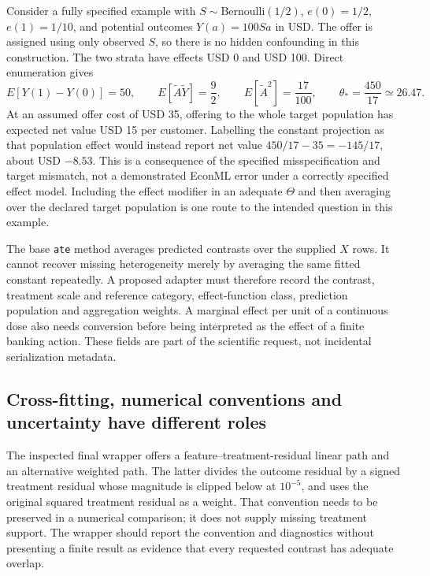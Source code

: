Consider a fully specified example with $S\sim\mathrm{Bernoulli}(1/2)$,
$e(0)=1/2$, $e(1)=1/10$, and potential outcomes $Y(a)=100Sa$ in USD.
The offer is assigned using only observed $S$, so there is no hidden
confounding in this construction. The two strata have effects USD 0 and
USD 100. Direct enumeration gives
\begin{equation}
 E[Y(1)-Y(0)]=50,\qquad
 E[\widetilde A\widetilde Y]=\frac92,\qquad
 E[\widetilde A^2]=\frac{17}{100},\qquad
 \theta_*=\frac{450}{17}\simeq26.47.
 \label{exec19:econml-money}
\end{equation}
At an assumed offer cost of USD 35, offering to the whole target population
has expected net value USD 15 per customer. Labelling the constant projection
as that population effect would instead report net value
$450/17-35=-145/17$, about USD $-8.53$. This is a consequence of the
specified misspecification and target mismatch, not a demonstrated EconML
error under a correctly specified effect model. Including the effect modifier
in an adequate $\Theta$ and then averaging over the declared target population
is one route to the intended question in this example.
\citep{exec19_econml_reference}

The base \texttt{ate} method averages predicted contrasts over the supplied
$X$ rows. It cannot recover missing heterogeneity merely by averaging the
same fitted constant repeatedly. A proposed adapter must therefore record
the contrast, treatment scale and reference category, effect-function class,
prediction population and aggregation weights. A marginal effect per unit
of a continuous dose also needs conversion before being interpreted as the
effect of a finite banking action. These fields are part of the scientific
request, not incidental serialization metadata.~\citep{exec19_econml_source}

\subsection{Cross-fitting, numerical conventions and uncertainty have different roles}
\label{exec19:econml-inference}

The inspected final wrapper offers a feature--treatment-residual linear path
and an alternative weighted path. The latter divides the outcome residual
by a signed treatment residual whose magnitude is clipped below at $10^{-5}$,
and uses the original squared treatment residual as a weight. That convention
needs to be preserved in a numerical comparison; it does not supply missing
treatment support. The wrapper should report the convention and diagnostics
without presenting a finite result as evidence that every requested contrast
has adequate overlap.~\citep{exec19_econml_source}

